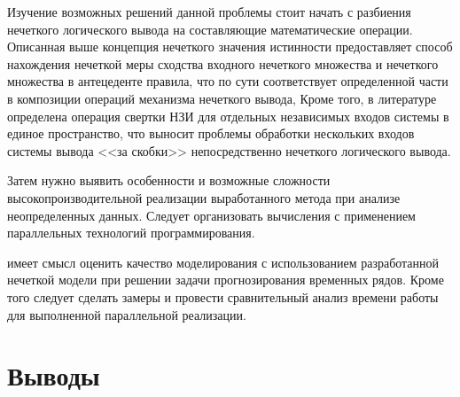Изучение возможных решений данной проблемы стоит начать с разбиения нечеткого логического вывода на составляющие математические операции. Описанная выше концепция нечеткого значения истинности предоставляет способ нахождения нечеткой меры сходства входного нечеткого множества и нечеткого множества в антецеденте правила, что по сути соответствует определенной части в композиции операций механизма нечеткого вывода, Кроме того, в литературе определена операция свертки НЗИ для отдельных независимых входов системы в единое пространство, что выносит проблемы обработки нескольких входов системы вывода <<за скобки>> непосредственно нечеткого логического вывода.

Затем нужно выявить особенности и возможные сложности высокопроизводительной реализации выработанного метода при анализе неопределенных данных. Следует организовать вычисления с применением параллельных технологий программирования.

 имеет смысл оценить качество моделирования с использованием разработанной нечеткой модели при решении задачи прогнозирования временных рядов. Кроме того следует сделать замеры и провести сравнительный анализ времени работы для выполненной параллельной реализации.

\section{Выводы}

